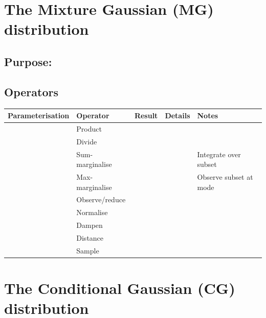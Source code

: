 \documentclass[oneside,english]{scrbook}
\begin{document}




\chapter{The Mixture Gaussian (MG) distribution}

\section{Purpose:}
\section{Operators}

\begin{tabular}{lllll}
  Parameterisation         & Operator             & Result                   & Details & Notes\\ \hline
                           & Product              &                          &         & \parbox{0.3\textwidth}{}\\
                           & Divide               &                          &         & \parbox{0.3\textwidth}{}\\
                           & Sum-marginalise      &                          &         & \parbox{0.3\textwidth}{Integrate over subset}\\
                           & Max-marginalise      &                          &         & \parbox{0.3\textwidth}{Observe subset at mode}\\
                           & Observe/reduce       &                          &         & \parbox{0.3\textwidth}{}\\
                           & Normalise            &                          &         & \parbox{0.3\textwidth}{}\\
                           & Dampen               &                          &         & \parbox{0.3\textwidth}{}\\
                           & Distance             &                          &         & \parbox{0.3\textwidth}{}\\
                           & Sample               &                          &         & \parbox{0.3\textwidth}{}\\
\end{tabular}

\chapter{The Conditional Gaussian (CG) distribution} \label{sec:CG}
\end{document}
